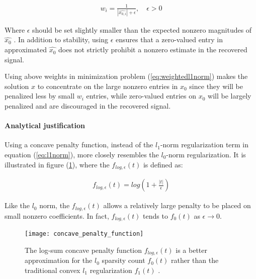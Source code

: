 \begin{equation}
\label{eq:weights}
\begin{gathered}
w_{i} = \frac{1}{\left | \hat{x_{0,i}} \right | + \epsilon } , \quad \epsilon > 0
\end{gathered}
\end{equation}

Where $\epsilon$ should be set slightly smaller than the expected nonzero magnitudes of $\hat{x_{0}}$ \cite{candes2008enhancing}. In addition to stability, using $\epsilon$ ensures that a zero-valued entry in approximated $\hat{x_{0}}$ does not strictly prohibit a nonzero estimate in the recovered signal.

Using above weights in minimization problem (\ref{eq:weightedl1norm}) makes the solution $x$ to concentrate on the large nonzero entries in $x_{0}$ since they will be penalized less by small $w_{i}$ entries, while zero-valued entries on $x_{0}$ will be largely penalized and are discouraged in the recovered signal.

\paragraph{Analytical justification} %
\label{subsubsection:analyticalJustification}

Using a concave penalty function, instead of the $l_1$-norm regularization term in equation (\ref{eq:l1norm}), more closely resembles the $l_0$-norm regularization. It is illustrated in figure (\ref{concave_penalty_function}), where the $f_{log,\epsilon}(t)$ is defined as:

\begin{equation}
\label{eq:concaveFunction}
\begin{gathered}
f_{log,\epsilon}(t) = log(1+\frac{\left | t \right |}{\epsilon })
\end{gathered}
\end{equation}

Like the $l_0$ norm, the $f_{log,\epsilon}(t)$ allows a relatively large penalty to be placed on small nonzero coefficients. In fact, $f_{log,\epsilon}(t)$ tends to $f_0(t)$ as $\epsilon \rightarrow 0$.

\begin{figure}
\centering
\texttt{[image: concave\_penalty\_function]}\
\centering
\caption{The log-sum concave penalty function $f_{log,\epsilon}(t)$ is a better approximation for the $l_0$ sparsity count $f_0(t)$ rather than the traditional convex $l_1$ regularization $f_1(t)$ \cite{candes2008enhancing}.}
\label{concave_penalty_function}
\end{figure}

